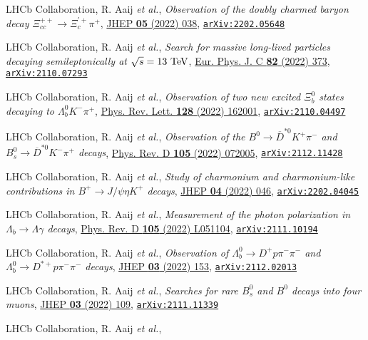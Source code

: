 \documentclass[a4paper, 11pt]{article}
\newenvironment{cvcontent}{
  \leftskip=0.5cm\rightskip=0cm
  \noindent\ignorespaces}{\par}
\newcommand{\arxiv}[1]{\href{https://arxiv.org/abs/#1}{\texttt{arXiv:#1}}}
\begin{document}
\begin{cvcontent}
\begin{enumerate}[label={[\arabic*]}, leftmargin=1.5cm]
    \item LHCb Collaboration, R. Aaij \emph{et al.},
    \emph{Observation of the doubly charmed baryon decay $\Xi_{cc}^{++}\to \Xi_{c}^{'+}\pi^{+}$},
    \href{https://doi.org/10.1007/JHEP05(2022)038}{JHEP \textbf{05} (2022) 038},
    \arxiv{2202.05648}
    \item LHCb Collaboration, R. Aaij \emph{et al.}, 
    \emph{Search for massive long-lived particles decaying semileptonically at $\sqrt{s} = 13~\rm{TeV}$},
    \href{https://doi.org/10.1140/epjc/s10052-022-10186-3}{Eur. Phys. J. C \textbf{82} (2022) 373},
    \arxiv{2110.07293}
    \item LHCb Collaboration, R. Aaij \emph{et al.}, 
    \emph{Observation of two new excited $\Xi_b^0$ states decaying to  $\Lambda_b^0 K^- \pi^+$},
    \href{https://link.aps.org/doi/10.1103/PhysRevLett.128.162001}{Phys. Rev. Lett. \textbf{128} (2022) 162001},
    \arxiv{2110.04497}
    \item LHCb Collaboration, R. Aaij \emph{et al.}, 
    \emph{Observation of the $B^0\rightarrow\overline{D}^{*0}K^{+}\pi^{-}$ and $B_s^0\rightarrow\overline{D}^{*0}K^{-}\pi^{+}$ decays},
    \href{https://link.aps.org/doi/10.1103/PhysRevD.105.072005}{Phys. Rev. D \textbf{105} (2022) 072005},
    \arxiv{2112.11428}
    \item LHCb Collaboration, R. Aaij \emph{et al.},
    \emph{Study of charmonium and charmonium-like contributions in $B^+ \rightarrow J/\psi \eta K^+$ decays},
    \href{https://doi.org/10.1007/JHEP04(2022)046}{JHEP \textbf{04} (2022) 046},
    \arxiv{2202.04045}
    \item LHCb Collaboration, R. Aaij \emph{et al.}, 
    \emph{Measurement of the photon polarization in $\Lambda_b \to \Lambda \gamma$ decays},
    \href{https://link.aps.org/doi/10.1103/PhysRevD.105.L051104}{Phys. Rev. D \textbf{105} (2022) L051104},
    \arxiv{2111.10194}
    \item LHCb Collaboration, R. Aaij \emph{et al.}, 
    \emph{Observation of $\Lambda_b^0\rightarrow D^+ p \pi^-\pi^-$ and $\Lambda_b^0\rightarrow D^{*+} p \pi^-\pi^-$ decays},
    \href{https://doi.org/10.1007/JHEP03(2022)153}{JHEP \textbf{03} (2022) 153},
    \arxiv{2112.02013}
    \item LHCb Collaboration, R. Aaij \emph{et al.}, 
    \emph{Searches for rare $B_s^0$ and $B^0$ decays into four muons},
    \href{https://doi.org/10.1007/JHEP03(2022)109}{JHEP \textbf{03} (2022) 109},
    \arxiv{2111.11339}
    \item LHCb Collaboration, R. Aaij \emph{et al.}, 

\end{enumerate}
\end{cvcontent}
\end{document}

